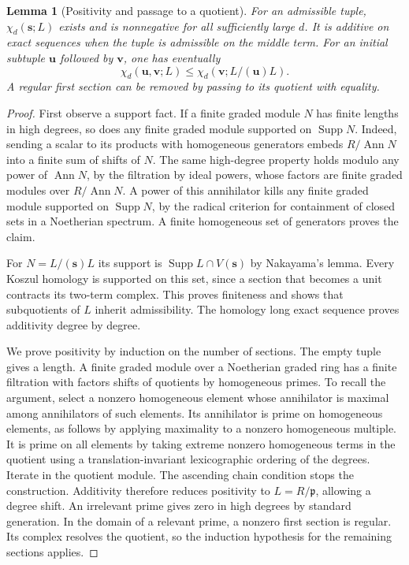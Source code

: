 \documentclass[a4paper,11pt]{article}
\newtheorem{lemma}[proposition]{Lemma}
\theoremstyle{definition}
\theoremstyle{remark}
\numberwithin{equation}{section}
\begin{document}
\begin{lemma}[Positivity and passage to a quotient]\label{lem:euler36}
For an admissible tuple, \(\chi_d(\mathbf s;L)\) exists and is nonnegative for all sufficiently large \(d\). It is additive on exact sequences when the tuple is admissible on the middle term. For an initial subtuple \(\mathbf u\) followed by \(\mathbf v\), one has eventually
\[
       \chi_d(\mathbf u,\mathbf v;L)
                         \le \chi_d(\mathbf v;L/(\mathbf u)L).
\]
A regular first section can be removed by passing to its quotient with equality.
\end{lemma}
\begin{proof}
First observe a support fact. If a finite graded module \(N\) has finite lengths in high degrees, so does any finite graded module supported on \(\operatorname{Supp} N\). Indeed, sending a scalar to its products with homogeneous generators embeds \(R/\operatorname{Ann}N\) into a finite sum of shifts of \(N\). The same high-degree property holds modulo any power of \(\operatorname{Ann}N\), by the filtration by ideal powers, whose factors are finite graded modules over \(R/\operatorname{Ann}N\). A power of this annihilator kills any finite graded module supported on \(\operatorname{Supp}N\), by the radical criterion for containment of closed sets in a Noetherian spectrum. A finite homogeneous set of generators proves the claim.

For \(N=L/(\mathbf s)L\) its support is \(\operatorname{Supp}L\cap V(\mathbf s)\) by Nakayama's lemma. Every Koszul homology is supported on this set, since a section that becomes a unit contracts its two-term complex. This proves finiteness and shows that subquotients of \(L\) inherit admissibility. The homology long exact sequence proves additivity degree by degree.

We prove positivity by induction on the number of sections. The empty tuple gives a length. A finite graded module over a Noetherian graded ring has a finite filtration with factors shifts of quotients by homogeneous primes. To recall the argument, select a nonzero homogeneous element whose annihilator is maximal among annihilators of such elements. Its annihilator is prime on homogeneous elements, as follows by applying maximality to a nonzero homogeneous multiple. It is prime on all elements by taking extreme nonzero homogeneous terms in the quotient using a translation-invariant lexicographic ordering of the degrees. Iterate in the quotient module. The ascending chain condition stops the construction. Additivity therefore reduces positivity to \(L=R/\mathfrak p\), allowing a degree shift. An irrelevant prime gives zero in high degrees by standard generation. In the domain of a relevant prime, a nonzero first section is regular. Its complex resolves the quotient, so the induction hypothesis for the remaining sections applies.


\end{proof}
\end{document}
